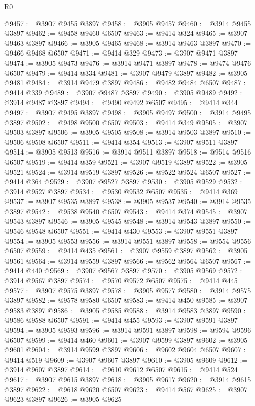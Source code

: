 \begin{lexlean}{R0}
\begin{coremodule}
@9457 := @3907 @9455 @3897
@9458 := @3905 @9457
@9460 := @3914 @9455 @3897
@9462 := @9458 @9460 @6507
@9463 := @9414 @324
@9465 := @3907 @9463 @3897
@9466 := @3905 @9465
@9468 := @3914 @9463 @3897
@9470 := @9466 @9468 @6507
@9471 := @9414 @329
@9473 := @3907 @9471 @3897
@9474 := @3905 @9473
@9476 := @3914 @9471 @3897
@9478 := @9474 @9476 @6507
@9479 := @9414 @334
@9481 := @3907 @9479 @3897
@9482 := @3905 @9481
@9484 := @3914 @9479 @3897
@9486 := @9482 @9484 @6507
@9487 := @9414 @339
@9489 := @3907 @9487 @3897
@9490 := @3905 @9489
@9492 := @3914 @9487 @3897
@9494 := @9490 @9492 @6507
@9495 := @9414 @344
@9497 := @3907 @9495 @3897
@9498 := @3905 @9497
@9500 := @3914 @9495 @3897
@9502 := @9498 @9500 @6507
@9503 := @9414 @349
@9505 := @3907 @9503 @3897
@9506 := @3905 @9505
@9508 := @3914 @9503 @3897
@9510 := @9506 @9508 @6507
@9511 := @9414 @354
@9513 := @3907 @9511 @3897
@9514 := @3905 @9513
@9516 := @3914 @9511 @3897
@9518 := @9514 @9516 @6507
@9519 := @9414 @359
@9521 := @3907 @9519 @3897
@9522 := @3905 @9521
@9524 := @3914 @9519 @3897
@9526 := @9522 @9524 @6507
@9527 := @9414 @364
@9529 := @3907 @9527 @3897
@9530 := @3905 @9529
@9532 := @3914 @9527 @3897
@9534 := @9530 @9532 @6507
@9535 := @9414 @369
@9537 := @3907 @9535 @3897
@9538 := @3905 @9537
@9540 := @3914 @9535 @3897
@9542 := @9538 @9540 @6507
@9543 := @9414 @374
@9545 := @3907 @9543 @3897
@9546 := @3905 @9545
@9548 := @3914 @9543 @3897
@9550 := @9546 @9548 @6507
@9551 := @9414 @430
@9553 := @3907 @9551 @3897
@9554 := @3905 @9553
@9556 := @3914 @9551 @3897
@9558 := @9554 @9556 @6507
@9559 := @9414 @435
@9561 := @3907 @9559 @3897
@9562 := @3905 @9561
@9564 := @3914 @9559 @3897
@9566 := @9562 @9564 @6507
@9567 := @9414 @440
@9569 := @3907 @9567 @3897
@9570 := @3905 @9569
@9572 := @3914 @9567 @3897
@9574 := @9570 @9572 @6507
@9575 := @9414 @445
@9577 := @3907 @9575 @3897
@9578 := @3905 @9577
@9580 := @3914 @9575 @3897
@9582 := @9578 @9580 @6507
@9583 := @9414 @450
@9585 := @3907 @9583 @3897
@9586 := @3905 @9585
@9588 := @3914 @9583 @3897
@9590 := @9586 @9588 @6507
@9591 := @9414 @455
@9593 := @3907 @9591 @3897
@9594 := @3905 @9593
@9596 := @3914 @9591 @3897
@9598 := @9594 @9596 @6507
@9599 := @9414 @460
@9601 := @3907 @9599 @3897
@9602 := @3905 @9601
@9604 := @3914 @9599 @3897
@9606 := @9602 @9604 @6507
@9607 := @9414 @519
@9609 := @3907 @9607 @3897
@9610 := @3905 @9609
@9612 := @3914 @9607 @3897
@9614 := @9610 @9612 @6507
@9615 := @9414 @524
@9617 := @3907 @9615 @3897
@9618 := @3905 @9617
@9620 := @3914 @9615 @3897
@9622 := @9618 @9620 @6507
@9623 := @9414 @567
@9625 := @3907 @9623 @3897
@9626 := @3905 @9625

\end{coremodule}
\end{lexlean}

